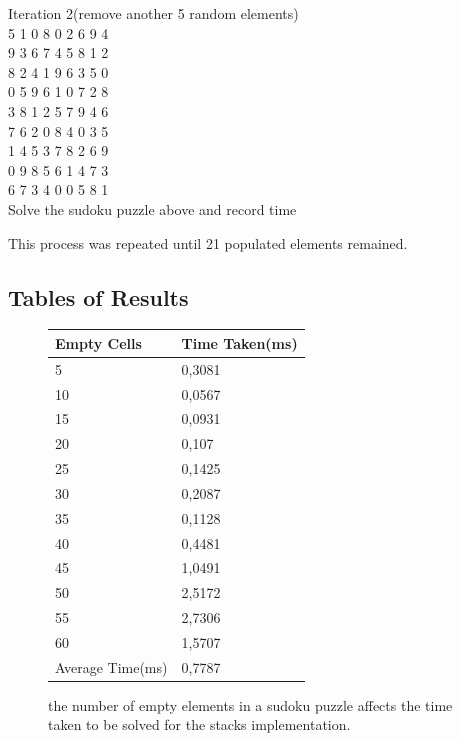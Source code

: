 \documentclass[11pt]{article}
\begin{document}
\vspace{3mm} %

Iteration 2(remove another 5 random elements)
\\5 1 0 8 0 2 6 9 4 
\\9 3 6 7 4 5 8 1 2 
\\8 2 4 1 9 6 3 5 0 
\\0 5 9 6 1 0 7 2 8 
\\3 8 1 2 5 7 9 4 6 
\\7 6 2 0 8 4 0 3 5 
\\1 4 5 3 7 8 2 6 9 
\\0 9 8 5 6 1 4 7 3 
\\6 7 3 4 0 0 5 8 1
\\Solve the sudoku puzzle above and record time

\vspace{3mm} %

This process was repeated until 21 populated elements remained.

\subsection{Tables of Results}

\begin{figure}[H]
\centering
\begin{tabular}{|l|l|}
\hline
Empty Cells & Time Taken(ms)\\
\hline
5	& 0,3081\\
10&	0,0567\\
15&	0,0931\\
20&	0,107\\
25&	0,1425\\
30&	0,2087\\
35&	0,1128\\
40&	0,4481\\
45&	1,0491\\
50&	2,5172\\
55&	2,7306\\
60&	1,5707\\
\hline
Average Time(ms) & 0,7787\\
\hline
\end{tabular}
\caption{the number of empty elements in a sudoku puzzle affects the time taken to be solved for the stacks implementation.}
\end{figure}
\end{document}

